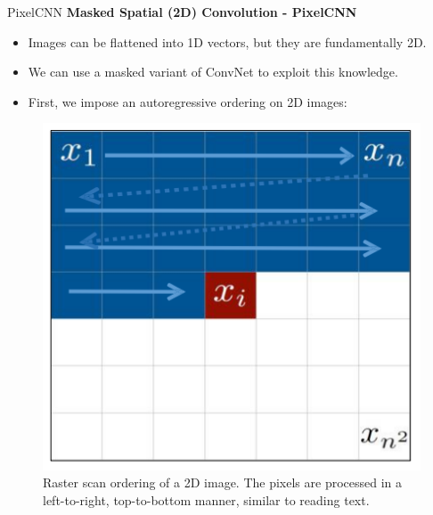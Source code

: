 \begin{frame}[allowframebreaks]{PixelCNN}
\textbf{Masked Spatial (2D) Convolution - PixelCNN}
\begin{itemize}
    \item Images can be flattened into 1D vectors, but they are fundamentally 2D.
    \item We can use a masked variant of ConvNet to exploit this knowledge.
    \item First, we impose an autoregressive ordering on 2D images:
\end{itemize}

\begin{figure}
    \centering
    \includegraphics[height=0.4\textheight, width=\textwidth,keepaspectratio]{images/arm/raster-scan.png}
    \caption{Raster scan ordering of a 2D image. The pixels are processed in a left-to-right, top-to-bottom manner, similar to reading text.}
\end{figure}


\end{frame}
